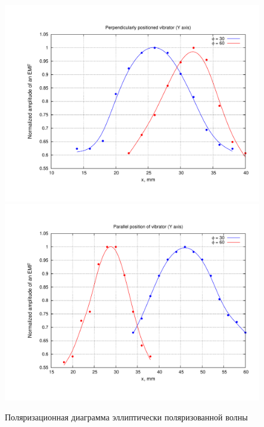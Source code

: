 \documentclass[11pt,a4paper,oneside, reqno]{amsproc}
\begin{document}
\begin{figure}[h!]
    \begin{center}
        \includegraphics[width=\textwidth]{plot3.pdf}
        \includegraphics[width=\textwidth]{plot4.pdf}
    \end{center}
    \caption{Поляризационная диаграмма эллиптически поляризованной волны}
    \label{fig:plot2}
\end{figure}
\end{document}
